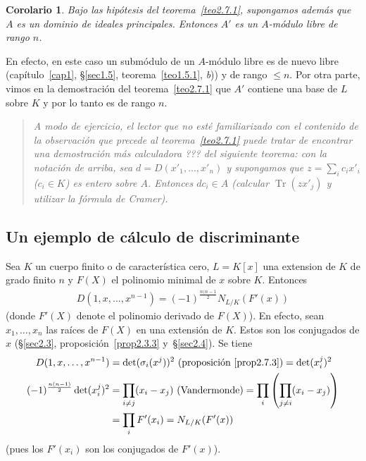\documentclass[bibtotoc,leqno,spanish]{amsbook}
\DeclareMathOperator{\Tr}{Tr}
\numberwithin{equation}{section}
\newenvironment{comm}%
	{\begin{quotation}\itshape}
	{\end{quotation}}
\theoremstyle{note}
\theoremstyle{note}
\newtheorem*{corollary*}{Corolario}
\theoremstyle{rem}
\numberwithin{theorem}{section}
\numberwithin{proposition}{section}
\numberwithin{definition}{section}
\numberwithin{lemma}{section}
\numberwithin{corollary}{section}
\numberwithin{example}{section}
\numberwithin{footnote}{section}%
\begin{document}
\begin{corollary*}
Bajo las hip\'otesis del teorema~\ref{teo2.7.1}, supongamos adem\'as que $A$ es un dominio de ideales principales. Entonces
$A'$ es un $A$-m\'odulo libre de rango $n$.
\end{corollary*}

En efecto, en este caso un subm\'odulo de un $A$-m\'odulo libre es de nuevo libre
(cap\'itulo~\ref{cap1}, \S\ref{sec1.5}, teorema~\ref{teo1.5.1}, {\itshape b}))
y de rango $\leq n$. Por otra parte, vimos en la demostraci\'on del teorema~\ref{teo2.7.1} que $A'$ contiene una base de $L$ sobre
$K$ y por lo tanto es de rango $n$.

\begin{comm}
A modo de ejercicio, el lector que no est\'e familiarizado con el contenido de la observaci\'on que
precede al teorema~\ref{teo2.7.1} puede tratar de encontrar una demostraci\'on m\'as calculadora ??? del siguiente teorema:
con la notaci\'on de arriba, sea $d = D(x'_{1},\dots,x'_{n})$ y supongamos que $z = \sum_{i}c_{i}x'_{i}$
($c_{i}\in K$) es entero sobre $A$. Entonces $dc_{i}\in A$ (calcular $\Tr(zx'_{j})$ y utilizar la f\'ormula de
Cramer).
\end{comm}

\subsection*{Un ejemplo de c\'alculo de discriminante}

Sea $K$ un cuerpo finito o de caracter\'istica cero, $L = K[x]$ una extension de $K$ de grado finito $n$ y
$F(X)$ el polinomio minimal de $x$ sobre $K$. Entonces
\begin{gather}\label{eq2.7.6}
D(1,x,\dots,x^{n-1})=(-1)^{\frac{n(n-1}{2}}N_{L/K}(F'(x))
\end{gather}
(donde $F'(X)$ denote el polinomio derivado de $F(X)$). En efecto, sean $x_{1},\dots,x_{n}$ las ra\'ices de
$F(X)$ en una extensi\'on de $K$. Estos son los conjugados de $x$
(\S\ref{sec2.3}, proposici\'on~\ref{prop2.3.3} y~\S\ref{sec2.4}). Se tiene
\begin{align*}
D(1,x,\dots,x^{n-1}) &= \det(\sigma_{i}(x^{j}))^{2}\text{ (proposici\'on~\ref{prop2.7.3})} = \det(x_{i}^{j})^{2}\\
(-1)^{\frac{n(n-1)}{2}}\det(x_{i}^{j})^{2} &= \prod_{i\neq j}(x_{i}-x_{j})\text{ (Vandermonde)} =
\prod_{i}\left(\prod_{j\neq i}(x_{i}-x_{j})\right)\\
&=\prod_{i}F'(x_{i}) = N_{L/K}(F'(x))
\end{align*}
(pues los $F'(x_{i})$ son los conjugados de $F'(x)$).
\end{document}
